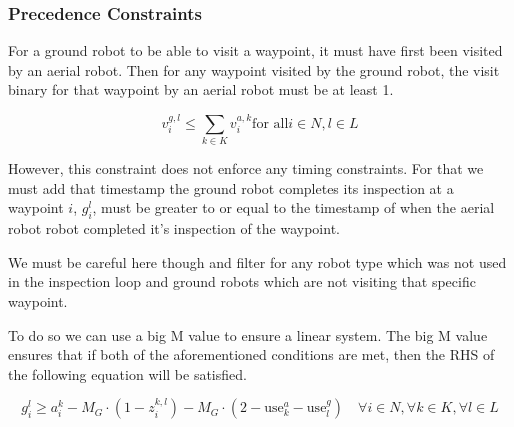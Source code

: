 \documentclass{article}
\begin{document}
			\subsubsection{Precedence Constraints}

				For a ground robot to be able to visit a waypoint, it must have first been visited by an aerial robot. 
				Then for any waypoint visited by the ground robot, the visit binary for that waypoint by an aerial robot must be at least 1.	

				\begin{equation}
 					v_i^{g,l} \leq \sum_{k \in K} v_i^{a,k} \text{for all} i \in N, l \in L
				\end{equation}


				However, this constraint does not enforce any timing constraints. For that we must add that timestamp the ground robot completes its inspection at a waypoint $i$, $g_i^l$, must be greater to or equal to the timestamp of when the aerial robot robot completed it's inspection of the waypoint.
				
				We must be careful here though and filter for any robot type which was not used in the inspection loop and ground robots which are not visiting that specific waypoint. 

				To do so we can use a big M value to ensure a linear system. The big M value ensures that if both of the aforementioned conditions are met, then the RHS of the following equation will be satisfied.

				\begin{equation}
					g_i^l \geq a_i^k - M_G \cdot (1 - z_i^{k,l}) - M_G \cdot (2 - \text{use}_k^a - \text{use}_l^g) \quad \forall i \in N, \forall k \in K, \forall l \in L
				\end{equation}

				

				\begin{comment}
					These four constraints ensure that z_i^{k,l} can only be 1 if all of the following are true:

					Ground robot l visits waypoint i (v_i^{g,l} = 1)
					Aerial robot k visits waypoint i (v_i^{a,k} = 1)
					Aerial robot k is being used (use_k^a = 1)
					Ground robot l is being used (use_l^g = 1)
				\end{comment}
\end{document}
